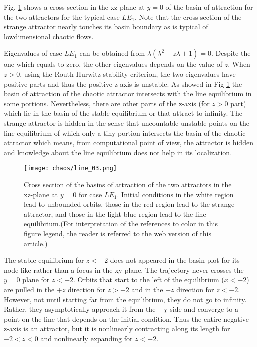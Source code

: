 Fig. \ref{fig:line_fig3} shows a cross section in the xz-plane at $y = 0$ of
the basin of attraction for the two attractors for the typical
case $LE_1$. Note that the cross section of the strange attractor
nearly touches its basin boundary as is typical of lowdimensional
chaotic flows.

Eigenvalues of case $LE_1$ can be obtained from
$\lambda(\lambda^2-z\lambda+1)=0$. Despite the one
which equals to zero, the other eigenvalues depends
on the value of $z$. When $z>0$, using the Routh-Hurwitz
stability criterion, the two eigenvalues have positive parts
and thus the positive z-axis is unstable. As showed in Fig \ref{fig:line_fig3}
the basin of attraction of the chaotic attractor intersects
with the line equilibrium in some portions. Nevertheless, there are
other parts of the z-axis (for $z>0$ part) which lie in the basin
of the stable equilibrium or that attract to infinity. The strange
attractor is hidden in the sense that uncountable unstable points
on the line equilibrium of which only a tiny portion intersects
the basin of the chaotic attractor which means, from computational point of view,
the attractor is hidden and knowledge about the line equilibrium does not
help in its localization.

\begin{figure}[htbp]
\centering
\texttt{[image: chaos/line\_03.png]}
\caption{\label{fig:line_fig3}
Cross section of the basins of attraction of the two attractors in the xz-plane at $y = 0$ for case $LE_1$. Initial conditions in the white region lead to
unbounded orbits, those in the red region lead to the strange attractor, and those in the light blue region lead to the line equilibrium.(For interpretation of
the references to color in this figure legend, the reader is referred to the web version of this article.)}
\end{figure}

The stable equilibrium for $z<-2$ does not appeared in the
basin plot for its node-like rather than a focus in the xy-plane.
The trajectory never crosses the $y=0$ plane for $z<-2$.
Orbits that start to the left of the equilibrium ($x < -2$) are
pulled in the $+z$ direction for $z > -2$ and in the $-z$ direction for $z < -2$.
However, not until starting far from the equilibrium, they do not go to infinity.
Rather, they asymptotically approach it from the $-\chi$ side and converge to a point
on the line that depends on the initial condition. Thus the entire negative
z-axis is an attractor, but it is nonlinearly contracting along
its length for $-2 < z < 0$ and nonlinearly expanding for $z < -2$.

